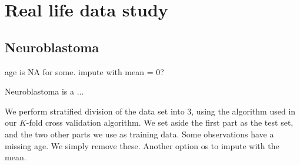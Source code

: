 \chapter{Real life data study}

\section{Neuroblastoma}
\citep{oberthuer-data}
age is NA for some. impute with mean = 0?

Neuroblastoma is a ...

We perform stratified division of the data set into 3, using the algorithm used in our $K$-fold cross validation algorithm.
We set aside the first part as the test set, and the two other parts we use as training data.
Some observations have a missing age. We simply remove these. Another option os to impute with the mean.